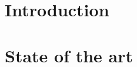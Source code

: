 




\begin{refsection}




\chapter[01]{Introduction}
 \chapter[02]{State of the art}


\end{refsection}
